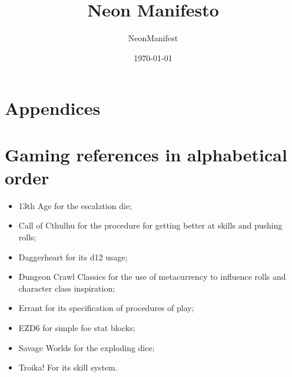 \documentclass{article}
\title{Neon Manifesto}
\author{NeonManifest}
\date{\today}
\begin{document}
\maketitle

\tableofcontents









\appendix
\section*{Appendices}
\section{Gaming references in alphabetical order}
\begin{itemize}
    \item {13th Age for the escalation die;}
    \item {Call of Cthulhu for the procedure for getting better at skills and pushing rolls;}
    \item {Daggerheart for its d12 usage;}
    \item {Dungeon Crawl Classics for the use of metacurrency to influence rolls and character class inspiration;}
    \item {Errant for its specification of procedures of play;}
    \item {EZD6 for simple foe stat blocks;}
    \item {Savage Worlds for the exploding dice;}
    \item {Troika! For its skill system.}
\end{itemize}
\end{document}
